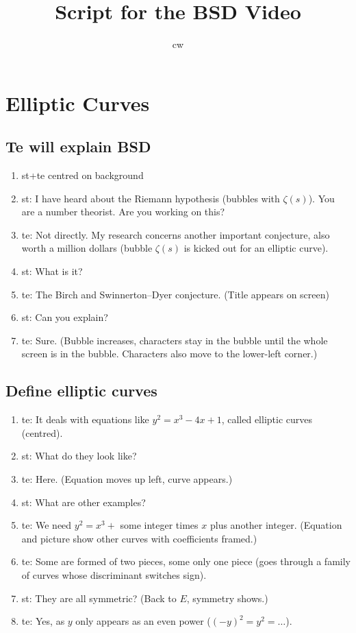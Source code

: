 \documentclass[a4paper]{article}
\begin{document}
\title{Script for the BSD Video}
\author{cw}
\maketitle

\section{Elliptic Curves}
\subsection{Te will explain BSD}

\begin{enumerate}
  \item st+te centred on background
  \item st: I have heard about the Riemann hypothesis (bubbles with $\zeta(s)$).
  You are a number theorist. Are you working on this?
  \item te: Not directly. My research concerns another important conjecture,
  also worth a million dollars (bubble $\zeta(s)$ is kicked out for an elliptic curve).
  \item st: What is it?
  \item te: The Birch and Swinnerton–Dyer conjecture. (Title appears on screen)
  \item st: Can you explain?
  \item te: Sure. (Bubble increases, characters stay in the bubble until the whole screen is in the bubble. Characters also move to the lower-left corner.)
\end{enumerate}

\subsection{Define elliptic curves}
 \begin{enumerate}
   \item te: It deals with equations like $y^2=x^3-4x+1$, called elliptic curves (centred).
   \item st: What do they look like?
   \item te: Here. (Equation moves up left, curve appears.)
   \item st: What are other examples?
   \item te:  We need $y^2 = x^3 +$ some integer times $x$ plus another integer. (Equation and picture show other curves with coefficients framed.)
  \item te: Some are formed of two pieces, some only one piece (goes through a family of curves whose discriminant switches sign).
  \item st: They are all symmetric? (Back to $E$, symmetry shows.)
  \item te: Yes, as $y$ only appears as an even power ($(-y)^2 = y^2 = \dots$).
\end{enumerate}
\end{document}
